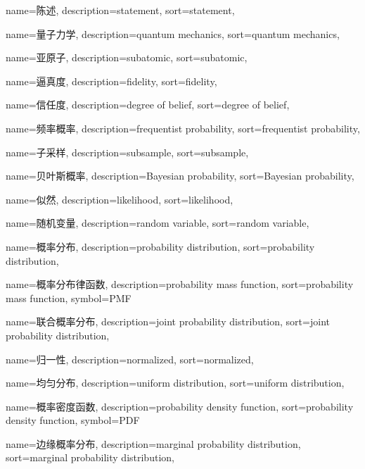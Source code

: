 {
  name=陈述,
  description={statement},
  sort={statement},
}

{
  name=量子力学,
  description={quantum mechanics},
  sort={quantum mechanics},
}

{
  name=亚原子,
  description={subatomic},
  sort={subatomic},
}

{
  name=逼真度,
  description={fidelity},
  sort={fidelity},
}

{
  name=信任度,
  description={degree of belief},
  sort={degree of belief},
}

{
  name=频率概率,
  description={frequentist probability},
  sort={frequentist probability},
}

{
  name=子采样,
  description={subsample},
  sort={subsample},
}

{
  name=贝叶斯概率,
  description={Bayesian probability},
  sort={Bayesian probability},
}

{
  name=似然,
  description={likelihood},
  sort={likelihood},
}

{
  name=随机变量,
  description={random variable},
  sort={random variable},
}

{
  name=概率分布,
  description={probability distribution},
  sort={probability distribution},
}

{
  name=概率分布律函数,
  description={probability mass function},
  sort={probability mass function},
  symbol={PMF}
}

{
  name=联合概率分布,
  description={joint probability distribution},
  sort={joint probability distribution},
}

{
  name=归一性,
  description={normalized},
  sort={normalized},
}

{
  name=均匀分布,
  description={uniform distribution},
  sort={uniform distribution},
}

{
  name=概率密度函数,
  description={probability density function},
  sort={probability density function},
  symbol={PDF}
}

{
  name=边缘概率分布,
  description={marginal probability distribution},
  sort={marginal probability distribution},
}

